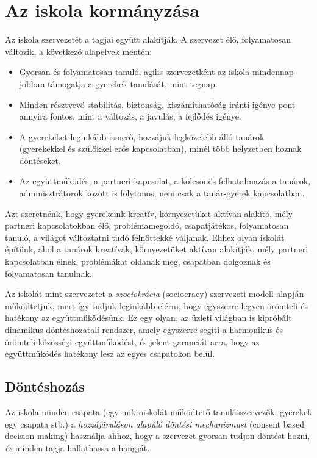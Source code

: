\section{Az iskola kormányzása}
\label{sec:az_iskola_kormanyzasa}
Az iskola szervezetét a tagjai együtt alakítják. A szervezet élő,
folyamatosan változik, a következő alapelvek mentén:

\begin{itemize}

\item
  Gyorsan és folyamatosan tanuló, agilis szervezetként az iskola minden\-nap jobban támogatja a gyerekek tanulását, mint tegnap.
\item
  Minden résztvevő stabilitás, biztonság, kiszámíthatóság iránti igénye
  pont annyira fontos, mint a változás, a javulás, a fejlődés igénye.
\item
  A gyerekeket leginkább ismerő, hozzájuk legközelebb álló tanárok
  (gyerekekkel és szülőkkel erős kapcsolatban), minél több helyzetben
  hoznak döntéseket.
\item
  Az együttműködés, a partneri kapcsolat, a kölcsönös felhatalmazás a
  tanárok, adminisztrátorok között is folytonos, nem csak a tanár-gyerek
  kapcsolatban.
\end{itemize}

Azt szeretnénk, hogy gyerekeink kreatív, környezetüket aktívan alakító,
mély partneri kapcsolatokban élő, problémamegoldó, csapatjátékos,
folyamatosan tanuló, a világot változtatni tudó felnőttekké váljanak.
Ehhez olyan iskolát építünk, ahol a tanárok kreatívak, környezetüket
aktívan alakítják, mély partneri kapcsolatban élnek, problémákat oldanak
meg, csapatban dolgoznak és folyamatosan tanulnak.

Az iskolát mint szervezetet a \emph{szociokrácia} (sociocracy)
szervezeti modell alapján működtetjük, mert így tudjuk leginkább
elérni, hogy egyszerre legyen örömteli és hatékony az
együttműködésünk. Ez egy olyan, az üzleti világban is kipróbált
dinamikus döntéshozatali rendszer, amely egyszerre segíti a harmonikus
és örömteli közösségi együttműködést, és jelent garanciát arra, hogy az
együttműködés hatékony lesz az egyes csapatokon belül.


\subsection{Döntéshozás}
\label{sec:consent_based}

Az iskola minden csapata (egy mikroiskolát működtető tanulásszervezők,
gyerekek egy csapata stb.) a \emph{hozzájáruláson alapúló döntési
mechanizmust} (consent based decision making) használja ahhoz, hogy a
szervezet gyorsan tudjon döntést hozni, \emph{és} minden tagja
hallathassa a hangját.

